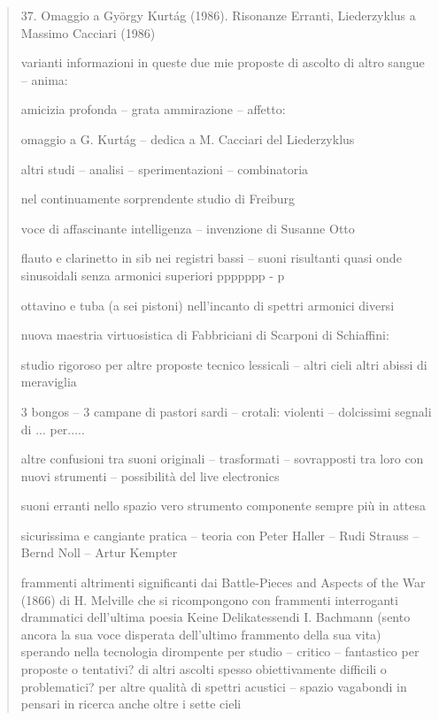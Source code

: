 
\begin{quote}

37. Omaggio a György Kurtág (1986). Risonanze Erranti, Liederzyklus a Massimo Cacciari (1986)

varianti informazioni in queste due mie proposte di ascolto di altro sangue – anima:

amicizia profonda – grata ammirazione – affetto:

omaggio a G. Kurtág – dedica a M. Cacciari del Liederzyklus

altri studi – analisi – sperimentazioni – combinatoria

nel continuamente sorprendente studio di Freiburg

voce di affascinante intelligenza – invenzione di Susanne Otto

flauto e clarinetto in sib nei registri bassi – suoni risultanti quasi onde sinusoidali senza armonici superiori ppppppp - p

ottavino e tuba (a sei pistoni) nell’incanto di spettri armonici diversi

nuova maestria virtuosistica di Fabbriciani di Scarponi di Schiaffini:

studio rigoroso per altre proposte tecnico lessicali – altri cieli altri abissi di meraviglia

3 bongos – 3 campane di pastori sardi – crotali: violenti – dolcissimi segnali di ... per.....

altre confusioni tra suoni originali – trasformati – sovrapposti tra loro con nuovi strumenti – possibilità del live electronics

suoni erranti nello spazio vero strumento componente sempre più in attesa

sicurissima e cangiante pratica – teoria con Peter Haller – Rudi Strauss – Bernd Noll – Artur Kempter

frammenti altrimenti significanti dai Battle-Pieces and Aspects of the War (1866) di H. Melville che si ricompongono con frammenti interroganti drammatici dell’ultima poesia Keine Delikatessendi I. Bachmann (sento ancora la sua voce disperata dell’ultimo frammento della sua vita) sperando nella tecnologia dirompente per studio – critico – fantastico per proposte o tentativi? di altri ascolti spesso obiettivamente difficili o problematici? per altre qualità di spettri acustici – spazio vagabondi in pensari in ricerca anche oltre i sette cieli


\end{quote}
